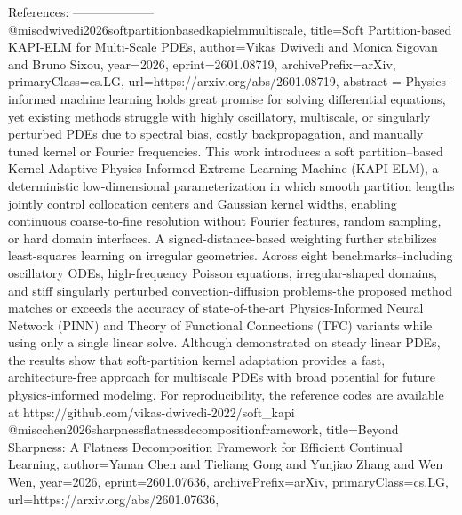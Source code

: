         References:
        --------------------
        @misc{dwivedi2026softpartitionbasedkapielmmultiscale,
      title={Soft Partition-based KAPI-ELM for Multi-Scale PDEs}, 
      author={Vikas Dwivedi and Monica Sigovan and Bruno Sixou},
      year={2026},
      eprint={2601.08719},
      archivePrefix={arXiv},
      primaryClass={cs.LG},
      url={https://arxiv.org/abs/2601.08719},
      abstract = {Physics-informed machine learning holds great promise for solving differential equations, yet existing methods struggle with highly oscillatory, multiscale, or singularly perturbed PDEs due to spectral bias, costly backpropagation, and manually tuned kernel or Fourier frequencies. This work introduces a soft partition--based Kernel-Adaptive Physics-Informed Extreme Learning Machine (KAPI-ELM), a deterministic low-dimensional parameterization in which smooth partition lengths jointly control collocation centers and Gaussian kernel widths, enabling continuous coarse-to-fine resolution without Fourier features, random sampling, or hard domain interfaces. A signed-distance-based weighting further stabilizes least-squares learning on irregular geometries. Across eight benchmarks--including oscillatory ODEs, high-frequency Poisson equations, irregular-shaped domains, and stiff singularly perturbed convection-diffusion problems-the proposed method matches or exceeds the accuracy of state-of-the-art Physics-Informed Neural Network (PINN) and Theory of Functional Connections (TFC) variants while using only a single linear solve. Although demonstrated on steady linear PDEs, the results show that soft-partition kernel adaptation provides a fast, architecture-free approach for multiscale PDEs with broad potential for future physics-informed modeling. For reproducibility, the reference codes are available at https://github.com/vikas-dwivedi-2022/soft_kapi}
}@misc{chen2026sharpnessflatnessdecompositionframework,
      title={Beyond Sharpness: A Flatness Decomposition Framework for Efficient Continual Learning}, 
      author={Yanan Chen and Tieliang Gong and Yunjiao Zhang and Wen Wen},
      year={2026},
      eprint={2601.07636},
      archivePrefix={arXiv},
      primaryClass={cs.LG},
      url={https://arxiv.org/abs/2601.07636},
}
